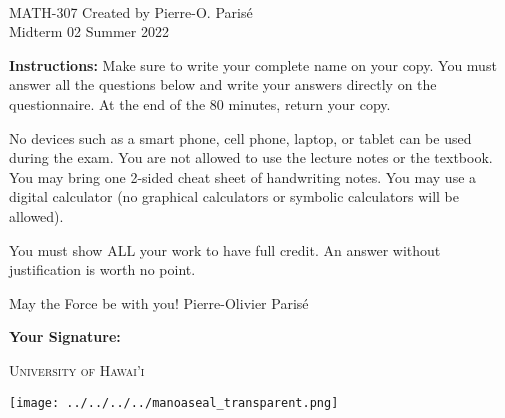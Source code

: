 \documentclass[addpoints, 12pt]{exam}%
\theoremstyle{definition}
\begin{document}
	\noindent \hrulefill \\
	\noindent MATH-307 \hfill Created by Pierre-O. Paris{\'e}\\
	Midterm 02 \hfill Summer 2022\\\vspace*{-0.7cm}

\noindent\hrulefill
	
\vspace*{1cm}

\noindent{}

\vspace*{1cm}
\begin{center}
\gradetable[h][questions]
\end{center}
\vspace*{1cm}

{\bf Instructions:} Make sure to write your complete name on your copy. You must answer all the questions below and write your answers directly on the questionnaire. At the end of the 80 minutes, return your copy. 

No devices such as a smart phone, cell phone, laptop, or tablet can be used during the exam. You are not allowed to use the lecture notes or the textbook. You may bring one 2-sided cheat sheet of handwriting notes. You may use a digital calculator (no graphical calculators or symbolic calculators will be allowed).

You must show ALL your work to have full credit. An answer without justification is worth no point.

\vspace*{2cm}
\noindent May the Force be with you! \hfill Pierre-Olivier Parisé

\vfill

\noindent\textbf{Your Signature:} \hrulefill

\vspace*{1cm}

\begin{center}
\begin{minipage}{0.29\textwidth}
\begin{Huge}
\textsc{University of Hawai'i}
\end{Huge}
\end{minipage}
\begin{minipage}{0.12\textwidth}
\texttt{[image: ../../../../manoaseal\_transparent.png]}
\end{minipage}
\end{center}
\end{document}
